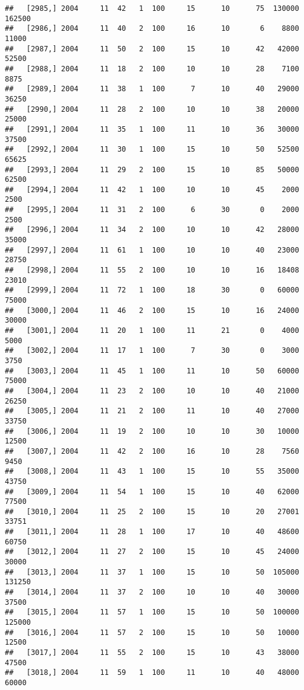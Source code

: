 \documentclass{article}\usepackage[]{graphicx}\usepackage[]{color}
\makeatletter
\newenvironment{kframe}{%
 \def\at@end@of@kframe{}%
 \ifinner\ifhmode%
  \def\at@end@of@kframe{\end{minipage}}%
  \begin{minipage}{\columnwidth}%
 \fi\fi%
 \def\FrameCommand##1{\hskip\@totalleftmargin \hskip-\fboxsep
 \colorbox{shadecolor}{##1}\hskip-\fboxsep
     \hskip-\linewidth \hskip-\@totalleftmargin \hskip\columnwidth}%
 \MakeFramed {\advance\hsize-\width
   \@totalleftmargin\z@ \linewidth\hsize
   \@setminipage}}%
 {\par\unskip\endMakeFramed%
 \at@end@of@kframe}
\newenvironment{knitrout}{}{} %
\makeatother
\begin{document}
\begin{knitrout}
\begin{kframe}
\begin{verbatim}
##   [2985,] 2004     11  42   1  100     15      10      75  130000  162500
##   [2986,] 2004     11  40   2  100     16      10       6    8800   11000
##   [2987,] 2004     11  50   2  100     15      10      42   42000   52500
##   [2988,] 2004     11  18   2  100     10      10      28    7100    8875
##   [2989,] 2004     11  38   1  100      7      10      40   29000   36250
##   [2990,] 2004     11  28   2  100     10      10      38   20000   25000
##   [2991,] 2004     11  35   1  100     11      10      36   30000   37500
##   [2992,] 2004     11  30   1  100     15      10      50   52500   65625
##   [2993,] 2004     11  29   2  100     15      10      85   50000   62500
##   [2994,] 2004     11  42   1  100     10      10      45    2000    2500
##   [2995,] 2004     11  31   2  100      6      30       0    2000    2500
##   [2996,] 2004     11  34   2  100     10      10      42   28000   35000
##   [2997,] 2004     11  61   1  100     10      10      40   23000   28750
##   [2998,] 2004     11  55   2  100     10      10      16   18408   23010
##   [2999,] 2004     11  72   1  100     18      30       0   60000   75000
##   [3000,] 2004     11  46   2  100     15      10      16   24000   30000
##   [3001,] 2004     11  20   1  100     11      21       0    4000    5000
##   [3002,] 2004     11  17   1  100      7      30       0    3000    3750
##   [3003,] 2004     11  45   1  100     11      10      50   60000   75000
##   [3004,] 2004     11  23   2  100     10      10      40   21000   26250
##   [3005,] 2004     11  21   2  100     11      10      40   27000   33750
##   [3006,] 2004     11  19   2  100     10      10      30   10000   12500
##   [3007,] 2004     11  42   2  100     16      10      28    7560    9450
##   [3008,] 2004     11  43   1  100     15      10      55   35000   43750
##   [3009,] 2004     11  54   1  100     15      10      40   62000   77500
##   [3010,] 2004     11  25   2  100     15      10      20   27001   33751
##   [3011,] 2004     11  28   1  100     17      10      40   48600   60750
##   [3012,] 2004     11  27   2  100     15      10      45   24000   30000
##   [3013,] 2004     11  37   1  100     15      10      50  105000  131250
##   [3014,] 2004     11  37   2  100     10      10      40   30000   37500
##   [3015,] 2004     11  57   1  100     15      10      50  100000  125000
##   [3016,] 2004     11  57   2  100     15      10      50   10000   12500
##   [3017,] 2004     11  55   2  100     15      10      43   38000   47500
##   [3018,] 2004     11  59   1  100     11      10      40   48000   60000

\end{verbatim}
\end{kframe}
\end{knitrout}
\end{document}
